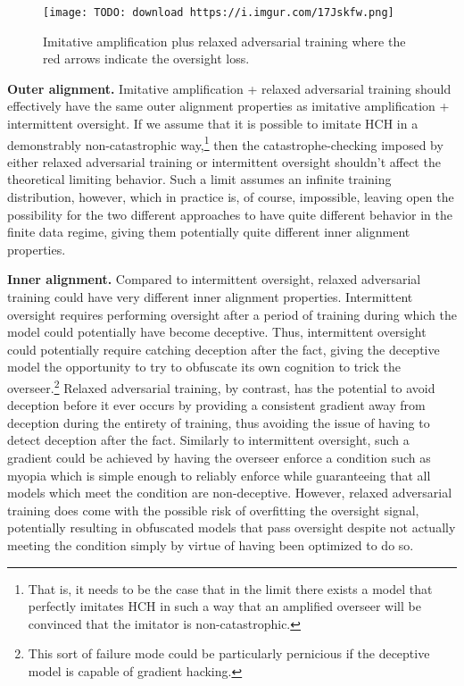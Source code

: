 \begin{figure}[h!]
  \centering
  \texttt{[image: TODO: download https://i.imgur.com/17Jskfw.png]}
  \caption{Imitative amplification plus relaxed adversarial training where the red arrows indicate the oversight loss.}
\end{figure}

\textbf{Outer alignment.} Imitative amplification + relaxed adversarial training should effectively have the same outer alignment properties as imitative amplification + intermittent oversight. If we assume that it is possible to imitate HCH in a demonstrably non-catastrophic way,\footnote{That is, it needs to be the case that in the limit there exists a model that perfectly imitates HCH in such a way that an amplified overseer will be convinced that the imitator is non-catastrophic.} then the catastrophe-checking imposed by either relaxed adversarial training or intermittent oversight shouldn't affect the theoretical limiting behavior. Such a limit assumes an infinite training distribution, however, which in practice is, of course, impossible, leaving open the possibility for the two different approaches to have quite different behavior in the finite data regime, giving them potentially quite different inner alignment properties.

\textbf{Inner alignment.} Compared to intermittent oversight, relaxed adversarial training could have very different inner alignment properties. Intermittent oversight requires performing oversight after a period of training during which the model could potentially have become deceptive. Thus, intermittent oversight could potentially require catching deception after the fact, giving the deceptive model the opportunity to try to obfuscate its own cognition to trick the overseer.\footnote{This sort of failure mode could be particularly pernicious if the deceptive model is capable of gradient hacking\cite{TODO: cite https://www.alignmentforum.org/posts/uXH4r6MmKPedk8rMA/gradient-hacking}.} Relaxed adversarial training, by contrast, has the potential to avoid deception before it ever occurs by providing a consistent gradient away from deception during the entirety of training, thus avoiding the issue of having to detect deception after the fact. Similarly to intermittent oversight, such a gradient could be achieved by having the overseer enforce a condition such as myopia\cite{TODO: cite https://www.alignmentforum.org/posts/BKM8uQS6QdJPZLqCr/towards-a-mechanistic-understanding-of-corrigibility} which is simple enough to reliably enforce while guaranteeing that all models which meet the condition are non-deceptive. However, relaxed adversarial training does come with the possible risk of overfitting the oversight signal, potentially resulting in obfuscated models that pass oversight despite not actually meeting the condition simply by virtue of having been optimized to do so.


